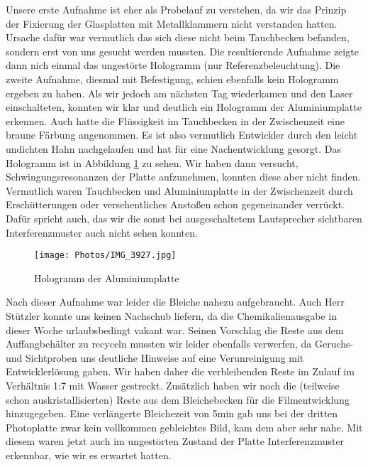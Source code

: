Unsere erste Aufnahme ist eher als Probelauf zu verstehen, da wir das Prinzip der Fixierung der Glasplatten mit Metallklammern nicht verstanden hatten. Ursache dafür war vermutlich das sich diese nicht beim Tauchbecken befanden, sondern erst von uns gesucht werden mussten. Die resultierende Aufnahme zeigte dann nich einmal das ungestörte Hologramm (nur Referenzbeleuchtung). Die zweite Aufnahme, diesmal mit Befestigung, schien ebenfalls kein Hologramm ergeben zu haben. Als wir jedoch am nächsten Tag wiederkamen und den Laser einschalteten, konnten wir klar und deutlich ein Hologramm der Aluminiumplatte erkennen. Auch hatte die Flüssigkeit im Tauchbecken in der Zwischenzeit eine braune Färbung angenommen. Es ist also vermutlich Entwickler durch den leicht undichten Hahn nachgelaufen und hat für eine Nachentwicklung gesorgt. Das Hologramm ist in Abbildung \ref{hologramm_aluplatte} zu sehen. Wir haben dann versucht, Schwingungsresonanzen der Platte aufzunehmen, konnten diese aber nicht finden. Vermutlich waren Tauchbecken und Aluminiumplatte in der Zwischenzeit durch Erschütterungen oder versehentliches Anstoßen schon gegeneinander verrückt. Dafür spricht auch, das wir die sonst bei ausgeschaltetem Lautsprecher sichtbaren Interferenzmuster auch nicht sehen konnten.  

\begin{figure}[ht]
 \texttt{[image: Photos/IMG\_3927.jpg]}
 \caption{Hologramm der Aluminiumplatte}
 \label{hologramm_aluplatte}
\end{figure}

Nach dieser Aufnahme war leider die Bleiche nahezu aufgebraucht. Auch Herr Stützler konnte uns keinen Nachschub liefern, da die Chemikalienausgabe in dieser Woche urlaubsbedingt vakant war. Seinen Vorschlag die Reste aus dem Auffangbehälter zu recyceln mussten wir leider ebenfalls verwerfen, da Geruchs- und Sichtproben uns deutliche Hinweise auf eine Verunreinigung mit Entwicklerlösung gaben. Wir haben daher die verbleibenden Reste im Zulauf im Verhältnis 1:7 mit Wasser gestreckt. Zusätzlich haben wir noch die (teilweise schon auskristallisierten) Reste aus dem Bleichebecken für die Filmentwicklung hinzugegeben. Eine verlängerte Bleichezeit von 5min gab uns bei der dritten Photoplatte zwar kein vollkommen gebleichtes Bild, kam dem aber sehr nahe. Mit diesem waren jetzt auch im ungestörten Zustand der Platte Interferenzmuster erkennbar, wie wir es erwartet hatten.



 